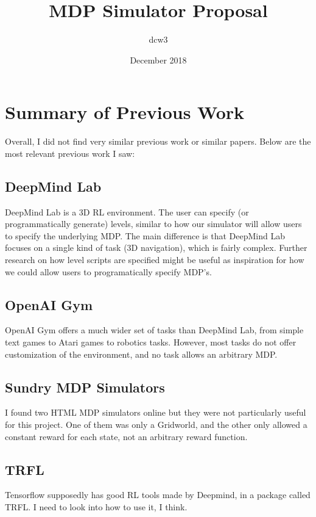 \documentclass{article}
\title{MDP Simulator Proposal}
\author{dcw3}
\date{December 2018}
\begin{document}
\maketitle

\section{Summary of Previous Work}

Overall, I did not find very similar previous work or similar papers. Below are the most relevant previous work I saw:

\subsection{DeepMind Lab}

DeepMind Lab is a 3D RL environment. The user can specify (or programmatically generate) levels, similar to how our simulator will allow users to specify the underlying MDP. The main difference is that DeepMind Lab focuses on a single kind of task (3D navigation), which is fairly complex.
Further research on how level scripts are specified might be useful as inspiration for how we could allow users to programatically specify MDP's.

\subsection{OpenAI Gym}

OpenAI Gym offers a much wider set of tasks than DeepMind Lab, from simple text games to Atari games to robotics tasks. However, most tasks do not offer customization of the environment, and no task allows an arbitrary MDP.

\subsection{Sundry MDP Simulators}

I found two HTML MDP simulators online but they were not particularly useful for this project. One of them was only a Gridworld, and the other only allowed a constant reward for each state, not an arbitrary reward function.

\subsection{TRFL}
Tensorflow supposedly has good RL tools made by Deepmind, in a package called TRFL. I need to look into how to use it, I think.
\end{document}
